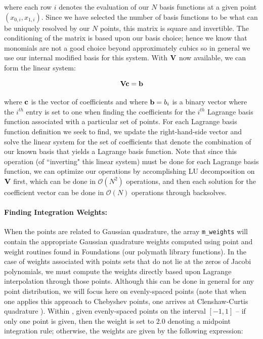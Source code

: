 \noindent where each row $i$ denotes the evaluation of our $N$ basis functions at a given point $(x_{0,i},x_{1,i})$.
Since we have selected the number of basis functions to be what can be uniquely resolved by our $N$ points, this matrix
is square and invertible.  The conditioning of the matrix is based upon our basis choice; hence we know that monomials 
are not a good choice beyond approximately cubics so in general we use our internal modified basis for this system.
With ${\bf V}$ now available, we can form the linear system:

\[
{\bf V}{\bf c} = {\bf b}
\]

\noindent where ${\bf c}$ is the vector of coefficients and where ${\bf b} = b_i$ is a binary vector where the $i^{th}$ entry is set to one
when finding the coefficients for the $i^{th}$ Lagrange basis function associated with a particular set of points.  For each Lagrange
basis function definition we seek to find, we update the right-hand-side vector and solve the linear system for the set of 
coefficients that denote the combination of our known basis that yields a Lagrange basis function.  Note that since this
operation (of ``inverting" this linear system) must be done for each Lagrange basis function, we can optimize our operations 
by accomplishing LU decomposition on ${\bf V}$ first, which can be done in $\mathcal{O}(N^2)$ operations, and then
each solution for the coefficient vector can be done in $\mathcal{O}(N)$ operations through backsolves.

\paragraph{Finding Integration Weights: }
When the points are related to Gaussian quadrature, the array \verb+m_weights+ will contain
the appropriate Gaussian quadrature weights computed using point and weight routines found in Foundations (our polymath
library functions).  In the case of weights associated with points sets that do not lie at the zeros of Jacobi polynomials, 
we must compute the weights directly based upon Lagrange interpolation through those points.  Although this can
be done in general for any point distribution, we will focus here on evenly-spaced points (note that when one
applies this approach to Chebyshev points, one arrives at Clenshaw-Curtis quadrature \cite{ClenshawC}).
Within {\nek}, given evenly-spaced points on the interval $[-1,1]$ -- if only one point is given,
then the weight is set to $2.0$ denoting a midpoint integration rule; otherwise, the weights are given by
the following expression:

